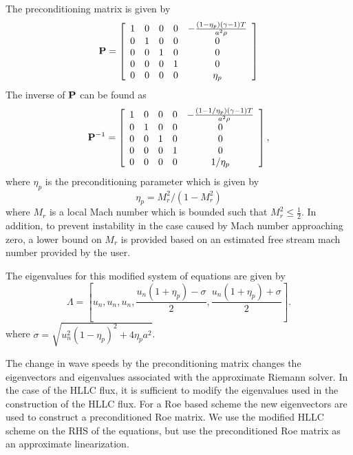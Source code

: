 The preconditioning matrix is given by
\begin{equation}
{\bf P} = \left[
{\begin{array}{ccccc}
1 & 0 & 0 & 0 & -\frac{(1-\eta_p)(\gamma-1) T}{a^2 \rho}  \\
0 & 1 & 0 & 0 & 0 \\
0 & 0 & 1 & 0 & 0 \\
0 & 0 & 0 & 1 & 0 \\
0 & 0 & 0 & 0 & \eta_p  \\
\end{array}}
\right]
\end{equation}
The inverse of ${\bf P}$ can be found as 
\begin{equation}
{\bf P}^{-1} = \left[
{\begin{array}{ccccc}
1 & 0 & 0 & 0 & -\frac{(1-1/\eta_p)(\gamma-1) T}{a^2 \rho}  \\
0 & 1 & 0 & 0 & 0 \\
0 & 0 & 1 & 0 & 0 \\
0 & 0 & 0 & 1 & 0 \\
0 & 0 & 0 & 0 & 1/\eta_p  \\
\end{array}}
\right],
\end{equation}
where $\eta_p$ is the preconditioning parameter which is given by
\begin{equation}
  \eta_p = M_r^2/(1-M_r^2)
\end{equation}
where $M_r$ is a local Mach number which is bounded such that $M_r^2 \le \frac{1}{2}$.  In addition, to prevent instability in the case caused by Mach number approaching zero, a lower bound on $M_r$ is provided based on an estimated free stream mach number provided by the user.


The eigenvalues for this modified system of equations are given by
\begin{equation}
\Lambda=[u_n,u_n,u_n, \frac{u_n(1+\eta_p)-\sigma}{2},\frac{u_n(1+\eta_p)+\sigma}{2}].
\end{equation}
where $\sigma=\sqrt{u_n^2(1-\eta_p)^2+4\eta_pa^2}$.


The change in wave speeds by the preconditioning matrix changes the
eigenvectors and eigenvalues associated with the approximate Riemann
solver.  In the case of the HLLC flux, it is sufficient to modify the
eigenvalues used in the construction of the HLLC flux. For a Roe based
scheme the new eigenvectors are used to construct a preconditioned Roe
matrix.  We use the modified HLLC scheme on the RHS of the equations,
but use the preconditioned Roe matrix as an approximate linearization.

